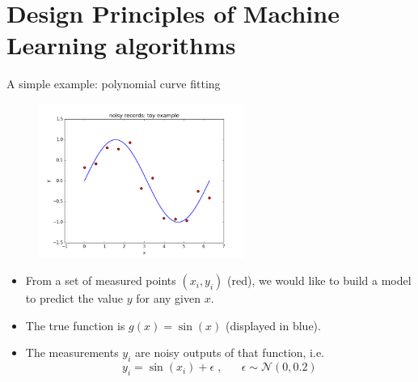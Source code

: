 \documentclass[xcolor=pdftex,dvipsnames,table]{beamer}
\begin{document}
\section{Design Principles of Machine Learning algorithms}
\frame{\tableofcontents[currentsection]}

\begin{frame}{A simple example: polynomial curve fitting}
\begin{figure}[htb]
\includegraphics[width=0.6\textwidth]{../graphics/sample_from_sin.png}
\end{figure}
\begin{itemize}
	\item From a set of measured points $(x_i, y_i)$ (red), we would like to build a model to predict the value $y$ for any given $x$. 
	\item The true function is $g(x)=\sin (x)$ (displayed in blue).
	\item The measurements $y_i$ are noisy outputs of that function, i.e. 
	\begin{equation}
	y_i = \sin (x_i) + \epsilon \; , \;\;\; \;\;\; \epsilon \sim \mathcal{N}(0,0.2)
	\end{equation}
\end{itemize}
\end{frame}
\end{document}
